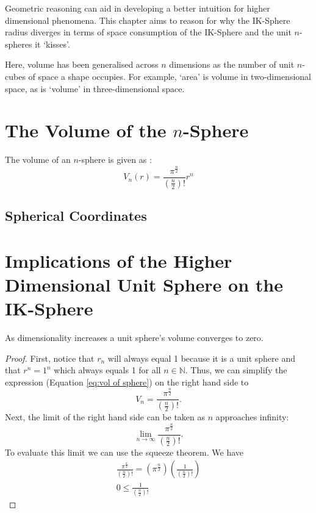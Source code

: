 Geometric reasoning can aid in developing a better intuition for higher dimensional phenomena. This chapter aims to reason for why the IK-Sphere radius diverges in terms of space consumption of the IK-Sphere and the unit $n$-spheres it `kisses'.

\begin{definition}[Volume]
    Here, volume has been generalised across $n$ dimensions as the number of unit $n$-cubes of space a shape occupies. For example, `area' is volume in two-dimensional space, as is `volume' in three-dimensional space. 
\end{definition}

\section{The Volume of the $n$-Sphere}
The volume of an $n$-sphere is given as \cite{formula_n_sphere}:
\begin{equation}\label{eq:vol of sphere}
    V_n(r)=\frac{\pi^{\frac{n}{2}}}{\left(\frac{n}{2}\right)!}r^n
\end{equation}

\subsection{Spherical Coordinates}

\section{Implications of the Higher Dimensional Unit Sphere on the IK-Sphere}
\begin{lemma}
    As dimensionality increases a unit sphere's volume converges to zero.
\end{lemma}
\begin{proof}
    First, notice that $r_n$ will always equal 1 because it is a unit sphere and that $r^n=1^n$ which always equals 1 for all $n \in \mathbb{N}$. Thus, we can simplify the expression (Equation \ref{eq:vol of sphere}) on the right hand side to
    \begin{equation*}
        V_n=\frac{\pi^{\frac{n}{2}}}{\left(\frac{n}{2}\right)!}.
    \end{equation*}
    Next, the limit of the right hand side can be taken as $n$ approaches infinity:
    \begin{equation*}
        \lim_{n\to\infty}\frac{\pi^{\frac{n}{2}}}{\left(\frac{n}{2}\right)!}.
    \end{equation*}
    To evaluate this limit we can use the squeeze theorem. We have
    \begin{align*}
        \frac{\pi^{\frac{n}{2}}}{\left(\frac{n}{2}\right)!} = \left(\pi^{\frac{n}{2}}\right)\left(\frac{1}{\left(\frac{n}{2}\right)!}\right)\\
        0\leq\frac{1}{\left(\frac{n}{2}\right)!}
    \end{align*}
\end{proof}

